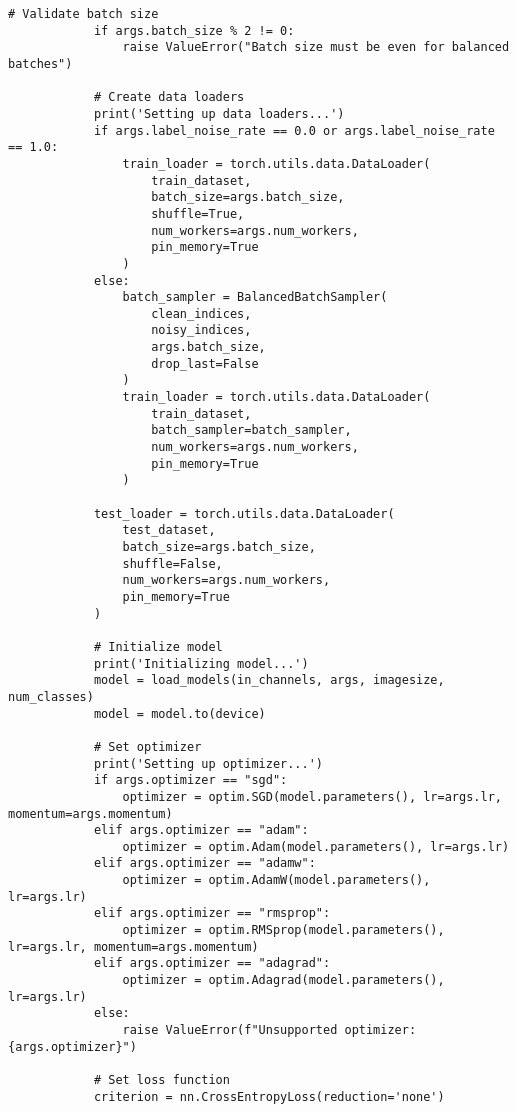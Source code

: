 \begin{lstlisting}[style=pythonstyle, caption={Program Example}]
            # Validate batch size
            if args.batch_size % 2 != 0:
                raise ValueError("Batch size must be even for balanced batches")
    
            # Create data loaders
            print('Setting up data loaders...')
            if args.label_noise_rate == 0.0 or args.label_noise_rate == 1.0:
                train_loader = torch.utils.data.DataLoader(
                    train_dataset,
                    batch_size=args.batch_size,
                    shuffle=True,
                    num_workers=args.num_workers,
                    pin_memory=True
                )
            else:
                batch_sampler = BalancedBatchSampler(
                    clean_indices,
                    noisy_indices,
                    args.batch_size,
                    drop_last=False
                )
                train_loader = torch.utils.data.DataLoader(
                    train_dataset,
                    batch_sampler=batch_sampler,
                    num_workers=args.num_workers,
                    pin_memory=True
                )
    
            test_loader = torch.utils.data.DataLoader(
                test_dataset,
                batch_size=args.batch_size,
                shuffle=False,
                num_workers=args.num_workers,
                pin_memory=True
            )
    
            # Initialize model
            print('Initializing model...')
            model = load_models(in_channels, args, imagesize, num_classes)
            model = model.to(device)
    
            # Set optimizer
            print('Setting up optimizer...')
            if args.optimizer == "sgd":
                optimizer = optim.SGD(model.parameters(), lr=args.lr, momentum=args.momentum)
            elif args.optimizer == "adam":
                optimizer = optim.Adam(model.parameters(), lr=args.lr)
            elif args.optimizer == "adamw":
                optimizer = optim.AdamW(model.parameters(), lr=args.lr)
            elif args.optimizer == "rmsprop":
                optimizer = optim.RMSprop(model.parameters(), lr=args.lr, momentum=args.momentum)
            elif args.optimizer == "adagrad":
                optimizer = optim.Adagrad(model.parameters(), lr=args.lr)
            else:
                raise ValueError(f"Unsupported optimizer: {args.optimizer}")
    
            # Set loss function
            criterion = nn.CrossEntropyLoss(reduction='none')
    

\end{lstlisting}
